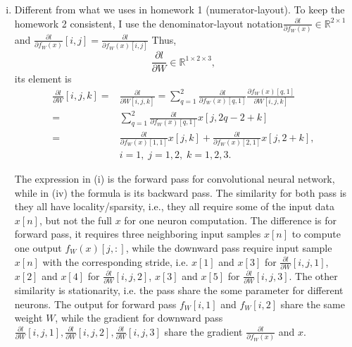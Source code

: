 \documentclass[10pt,a4paper]{article}
\theoremstyle{dotlessP}
\def\RR{\mathbb{R}}
\begin{document}
\begin{enumerate}[(a)]
\begin{enumerate}[(i)]
		\item Different from what we uses in homework 1 (numerator-layout). To keep the homework 2 consistent, I use the denominator-layout notation$\frac{\partial l}{\partial f_W(x)}\in \RR^{2\times 1}$ and $\frac{\partial l}{\partial f_W(x)}[i,j]=\frac{\partial l}{\partial f_W(x)[i,j]}$ Thus, 
		\begin{equation}
		\frac{\partial l}{\partial W}\in \RR^{1\times 2 \times 3},
		\end{equation}
		its element is 
		\begin{equation}
		\begin{aligned}
		\frac{\partial l}{\partial W}[i,j,k]=&\frac{\partial l}{\partial W[i,j,k]}
		= \sum_{q=1}^2\frac{\partial l}{\partial f_W(x)[q,1]}\frac{\partial f_W(x)[q,1]}{\partial W[i,j,k]}\\
		=&\sum_{q=1}^2\frac{\partial l}{\partial f_W(x)[q,1]} x[j,2q-2+k]\\
		= &\frac{\partial l}{\partial f_W(x)[1,1]} x[j,k]+\frac{\partial l}{\partial f_W(x)[2,1]} x[j,2+k], \\
		&i=1,\; j=1,2,\; k=1,2,3.
		\end{aligned}
		\end{equation}
		
		The expression in (i) is the forward pass for convolutional neural network, while in (iv) the formula is its backward pass. The similarity for both pass is they all have locality/sparsity, i.e., they all require some of the input data $x[n]$, but not the full $x$ for one neuron computation. The difference is for forward pass, it requires three neighboring input samples $x[n]$ to compute one output $f_W(x)[j,:]$, while the downward pass require input sample $x[n]$ with the corresponding stride, i.e. $x[1]$ and $x[3]$ for $\frac{\partial l}{\partial W}[i,j,1]$, $x[2]$ and $x[4]$ for $\frac{\partial l}{\partial W}[i,j,2]$, $x[3]$ and $x[5]$ for $\frac{\partial l}{\partial W}[i,j,3]$. The other similarity is stationarity, i.e. the pass share the some parameter for different neurons. The output for forward pass $f_W[i,1]$ and $f_W[i,2]$ share the same weight $W$, while the gradient for downward pass $\frac{\partial l}{\partial W}[i,j,1], \frac{\partial l}{\partial W}[i,j,2], \frac{\partial l}{\partial W}[i,j,3]$ share the gradient $\frac{\partial l}{\partial f_W(x)}$ and $x$.
	\end{enumerate}
\end{enumerate}
\newpage
\end{document}
